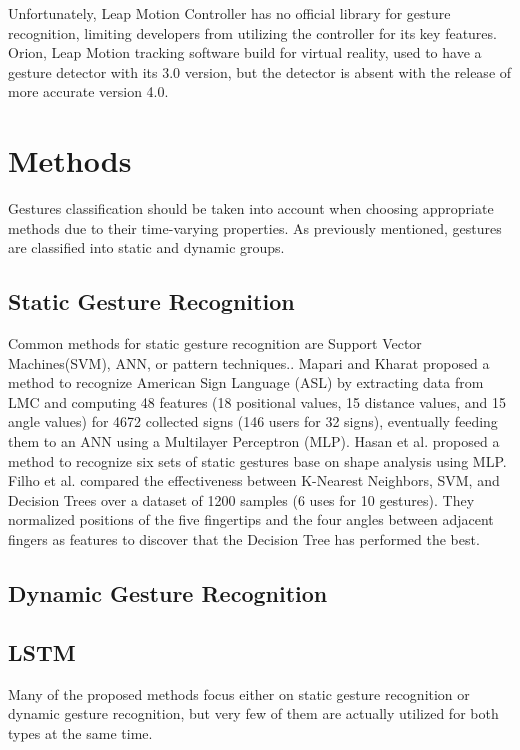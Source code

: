 Unfortunately, Leap Motion Controller has no official library for gesture recognition, limiting developers from utilizing the controller for its key features. Orion, Leap Motion tracking software build for virtual reality, used to have a gesture detector with its 3.0 version, but the detector is absent with the release of more accurate version 4.0.

\section{Methods}

Gestures classification should be taken into account when choosing appropriate methods due to their time-varying properties. As previously mentioned, gestures are classified into static and dynamic groups.

\subsection{Static Gesture Recognition}

Common methods for static gesture recognition are Support Vector Machines(SVM), ANN, or pattern techniques.\cite{savaris}.
Mapari and Kharat\cite{mapari} proposed a method to recognize American Sign Language (ASL) by extracting data from LMC and computing 48 features 
(18 positional values, 15 distance values, and 15 angle values) for 4672 collected signs (146 users for 32 signs), eventually feeding them to an ANN using a Multilayer Perceptron (MLP).\cite{katiacnn} Hasan et al.\cite{hasanmlp} proposed a method to recognize six sets of static gestures base on shape analysis using MLP.
Filho et al.\cite{filaml} compared the effectiveness between K-Nearest Neighbors, SVM, and Decision Trees over a dataset of 1200 samples (6 uses for 10 gestures). They normalized positions of the five fingertips and the four angles between adjacent fingers as features to discover that the Decision Tree has performed the best.\cite{katiacnn}

\subsection{Dynamic Gesture Recognition}

\subsection{LSTM}
Many of the proposed methods focus either on static gesture recognition or dynamic gesture recognition, but very few of them are actually utilized for both types at the same time. 
